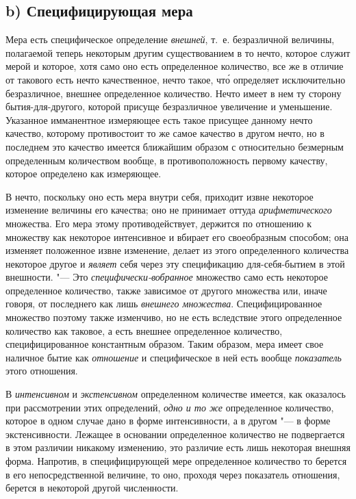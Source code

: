 \subsection[b) Специфицирующая мера]{b) Специфицирующая мера}

Мера есть специфическое определение {\em внешней}, т.~е. безразличной величины,
полагаемой теперь некоторым другим существованием в то нечто, которое служит
мерой и которое, хотя само оно есть определенное количество, все же в отличие
от такового есть нечто качественное, нечто такое, чт\'{о} определяет
исключительно безразличное, внешнее определенное количество. Нечто имеет в нем
ту сторону бытия-для-другого, которой присуще безразличное увеличение и
уменьшение. Указанное имманентное измеряющее есть такое присущее данному нечто
качество, которому противостоит то же самое качество в другом нечто, но в
последнем это качество имеется ближайшим образом с относительно безмерным
определенным количеством вообще, в противоположность первому качеству, которое
определено как измеряющее.

В нечто, поскольку оно есть мера внутри себя, приходит извне некоторое
изменение величины его качества; оно не принимает оттуда {\em арифметического}
множества. Его мера этому противодействует, держится по отношению к множеству
как некоторое интенсивное и вбирает его своеобразным способом; она изменяет
положенное извне изменение, делает из этого определенного количества некоторое
другое и {\em являет} себя через эту спецификацию для-себя-бытием в этой
внешности. "--- Это {\em специфически-вобранное} множество само есть некоторое
определенное количество, также зависимое от другого множества или, иначе
говоря, от последнего как лишь {\em внешнего множества}. Специфицированное
множество поэтому также изменчиво, но не есть вследствие этого определенное
количество как таковое, а есть внешнее определенное количество,
специфицированное константным образом. Таким образом, мера имеет свое наличное
бытие как {\em отношение} и специфическое в ней есть вообще {\em показатель}
этого отношения.

В {\em интенсивном} и {\em экстенсивном} определенном количестве имеется, как
оказалось при рассмотрении этих определений, {\em одно и то же} определенное
количество, которое в одном случае дано в форме интенсивности, а в другом "---
в форме экстенсивности. Лежащее в основании определенное количество не
подвергается в этом различии никакому изменению, это различие есть лишь
некоторая внешняя форма. Напротив, в специфицирующей мере определенное
количество то берется в его непосредственной величине, то оно, проходя через
показатель отношения, берется в некоторой другой численности.


